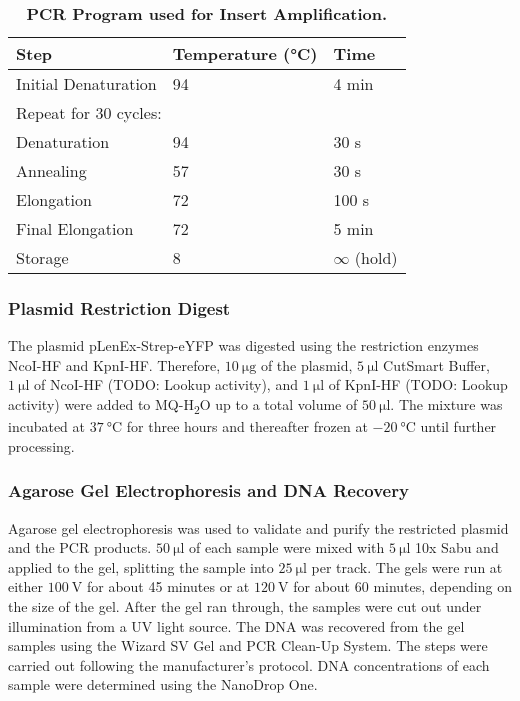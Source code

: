 \begin{table}[ht]
    \centering
    \caption{\textbf{PCR Program used for Insert Amplification.}}
    \label{tab:methods_pcr_cycle}
    \begin{tabular}{lll}
    \toprule
    \textbf{Step} & \textbf{Temperature (°C)} & \textbf{Time} \\
    \midrule
    Initial Denaturation     & 94  & 4 min   \\[1ex]
    \multicolumn{3}{l}{Repeat for 30 cycles:} \\[1ex]
    \quad Denaturation       & 94  & 30 s    \\
    \quad Annealing          & 57  & 30 s    \\
    \quad Elongation         & 72  & 100 s   \\[1ex]
    Final Elongation         & 72  & 5 min   \\
    Storage                  & 8   & $\infty$ (hold)  \\
    \bottomrule
    \end{tabular}
\end{table}
\subsubsection{Plasmid Restriction Digest}
The plasmid pLenEx-Strep-eYFP was digested using the restriction enzymes NcoI-HF and KpnI-HF. Therefore, $\SI{10}{\micro\gram}$ of the plasmid, $\SI{5}{\micro\litre}$ CutSmart\textsuperscript{\textregistered} Buffer, $\SI{1}{\micro\litre}$ of NcoI-HF (TODO: Lookup activity), and $\SI{1}{\micro\litre}$ of KpnI-HF (TODO: Lookup activity) were added to MQ-H\textsubscript{2}O up to a total volume of $\SI{50}{\micro\litre}$. The mixture was incubated at $\SI{37}{\degreeCelsius}$ for three hours and thereafter frozen at $\SI{-20}{\degreeCelsius}$ until further processing. 

\subsubsection{Agarose Gel Electrophoresis and DNA Recovery}
Agarose gel electrophoresis was used to validate and purify the restricted plasmid and the PCR products. $\SI{50}{\micro\litre}$ of each sample were mixed with $\SI{5}{\micro\litre}$ 10x Sabu and applied to the gel, splitting the sample into $\SI{25}{\micro\litre}$ per track. The gels were run at either $\SI{100}{\volt}$ for about 45 minutes or at $\SI{120}{\volt}$ for about 60 minutes, depending on the size of the gel. After the gel ran through, the samples were cut out under illumination from a UV light source. The DNA was recovered from the gel samples using the Wizard\textsuperscript{\textregistered} SV Gel and PCR Clean-Up System. The steps were carried out following the manufacturer's protocol. DNA concentrations of each sample were determined using the NanoDrop\textsuperscript{\texttrademark} One.


